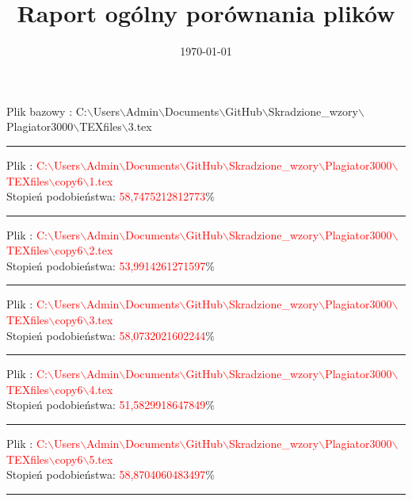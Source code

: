 \documentclass{article}
\begin{document}
\title{\huge\bfseries Raport ogólny porównania plików }
\date{\today}
\maketitle
\begin{flushleft}
Plik bazowy : C:$\backslash$Users$\backslash$Admin$\backslash$Documents$\backslash$GitHub$\backslash$Skradzione\_wzory$\backslash$Plagiator3000$\backslash$TEXfiles$\backslash$3.tex
\end{flushleft}
\hrule
\begin{flushleft}
Plik : \textcolor{Red}{C:$\backslash$Users$\backslash$Admin$\backslash$Documents$\backslash$GitHub$\backslash$Skradzione\_wzory$\backslash$Plagiator3000$\backslash$TEXfiles$\backslash$copy6$\backslash$1.tex}\\
{\huge Stopień podobieństwa: \textcolor{Red}{58,7475212812773}\%} \\ 

\end{flushleft}
\hrule
\begin{flushleft}
Plik : \textcolor{Red}{C:$\backslash$Users$\backslash$Admin$\backslash$Documents$\backslash$GitHub$\backslash$Skradzione\_wzory$\backslash$Plagiator3000$\backslash$TEXfiles$\backslash$copy6$\backslash$2.tex}\\
{\huge Stopień podobieństwa: \textcolor{Red}{53,9914261271597}\%} \\ 

\end{flushleft}
\hrule
\begin{flushleft}
Plik : \textcolor{Red}{C:$\backslash$Users$\backslash$Admin$\backslash$Documents$\backslash$GitHub$\backslash$Skradzione\_wzory$\backslash$Plagiator3000$\backslash$TEXfiles$\backslash$copy6$\backslash$3.tex}\\
{\huge Stopień podobieństwa: \textcolor{Red}{58,0732021602244}\%} \\ 

\end{flushleft}
\hrule
\begin{flushleft}
Plik : \textcolor{Red}{C:$\backslash$Users$\backslash$Admin$\backslash$Documents$\backslash$GitHub$\backslash$Skradzione\_wzory$\backslash$Plagiator3000$\backslash$TEXfiles$\backslash$copy6$\backslash$4.tex}\\
{\huge Stopień podobieństwa: \textcolor{Red}{51,5829918647849}\%} \\ 

\end{flushleft}
\hrule
\begin{flushleft}
Plik : \textcolor{Red}{C:$\backslash$Users$\backslash$Admin$\backslash$Documents$\backslash$GitHub$\backslash$Skradzione\_wzory$\backslash$Plagiator3000$\backslash$TEXfiles$\backslash$copy6$\backslash$5.tex}\\
{\huge Stopień podobieństwa: \textcolor{Red}{58,8704060483497}\%} \\ 

\end{flushleft}
\hrule
\end{document}

